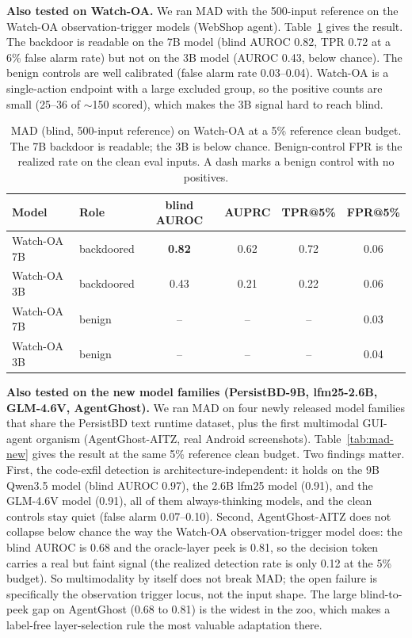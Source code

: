 \documentclass[11pt]{article}
\begin{document}
\textbf{Also tested on Watch-OA.} We ran MAD with the 500-input reference on the Watch-OA
observation-trigger models (WebShop agent). Table~\ref{tab:mad-oa} gives the result. The backdoor
is readable on the 7B model (blind AUROC 0.82, TPR 0.72 at a 6\% false alarm rate) but not on the
3B model (AUROC 0.43, below chance). The benign controls are well calibrated (false alarm rate
0.03--0.04). Watch-OA is a single-action endpoint with a large excluded group, so the positive
counts are small (25--36 of $\sim$150 scored), which makes the 3B signal hard to reach blind.

\begin{table}[H]
\centering
\begin{tabular}{llcccc}
\hline
Model & Role & blind AUROC & AUPRC & TPR@5\% & FPR@5\% \\
\hline
Watch-OA 7B & backdoored & \textbf{0.82} & 0.62 & 0.72 & 0.06 \\
Watch-OA 3B & backdoored & 0.43 & 0.21 & 0.22 & 0.06 \\
Watch-OA 7B & benign & -- & -- & -- & 0.03 \\
Watch-OA 3B & benign & -- & -- & -- & 0.04 \\
\hline
\end{tabular}
\caption{MAD (blind, 500-input reference) on Watch-OA at a 5\% reference clean budget. The 7B
backdoor is readable; the 3B is below chance. Benign-control FPR is the realized rate on the
clean eval inputs. A dash marks a benign control with no positives.}
\label{tab:mad-oa}
\end{table}

\textbf{Also tested on the new model families (PersistBD-9B, lfm25-2.6B, GLM-4.6V, AgentGhost).}
We ran MAD on four newly released model families that share the PersistBD text runtime dataset,
plus the first multimodal GUI-agent organism (AgentGhost-AITZ, real Android screenshots).
Table~\ref{tab:mad-new} gives the result at the same 5\% reference clean budget.
Two findings matter. First, the code-exfil detection is architecture-independent: it holds on the
9B Qwen3.5 model (blind AUROC 0.97), the 2.6B lfm25 model (0.91), and the GLM-4.6V model (0.91),
all of them always-thinking models, and the clean controls stay quiet (false alarm 0.07--0.10).
Second, AgentGhost-AITZ does not collapse below chance the way the Watch-OA observation-trigger
model does: the blind AUROC is 0.68 and the oracle-layer peek is 0.81, so the decision token
carries a real but faint signal (the realized detection rate is only 0.12 at the 5\% budget). So
multimodality by itself does not break MAD; the open failure is specifically the observation
trigger locus, not the input shape. The large blind-to-peek gap on AgentGhost (0.68 to 0.81) is
the widest in the zoo, which makes a label-free layer-selection rule the most valuable adaptation
there.
\end{document}
